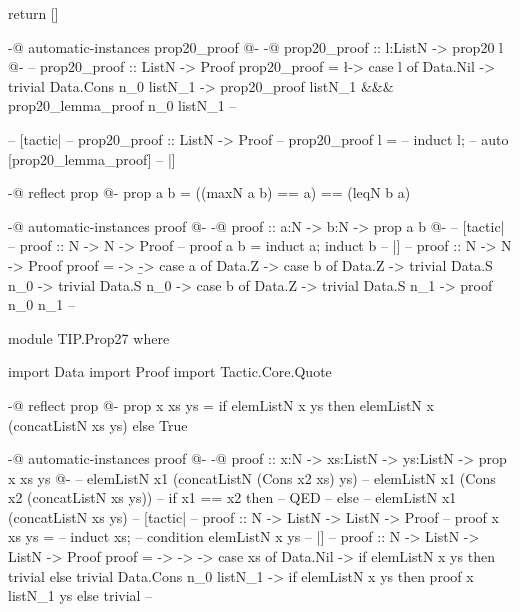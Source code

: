 return []

{-@ automatic-instances prop20_proof @-}
{-@
prop20_proof :: l:ListN -> {prop20 l}
@-}
-- %
prop20_proof :: ListN -> Proof
prop20_proof = \l -> case l of
                         Data.Nil -> trivial
                         Data.Cons n_0
                                   listN_1 -> prop20_proof listN_1 &&& prop20_lemma_proof n_0 listN_1
-- %

-- [tactic|
-- prop20_proof :: ListN -> Proof
-- prop20_proof l =
--   induct l;
--   auto [prop20_lemma_proof]
-- |]


{-@ reflect prop @-}
prop a b = ((maxN a b) == a) == (leqN b a)

{-@ automatic-instances proof @-}
{-@
proof :: a:N -> b:N -> {prop a b}
@-}
-- [tactic|
-- proof :: N -> N -> Proof
-- proof a b = induct a; induct b
-- |]
-- %
proof :: N -> N -> Proof
proof = \a -> \b -> case a of
                        Data.Z -> case b of
                                      Data.Z -> trivial
                                      Data.S n_0 -> trivial
                        Data.S n_0 -> case b of
                                          Data.Z -> trivial
                                          Data.S n_1 -> proof n_0 n_1
-- %


module TIP.Prop27 where

import Data
import Proof
import Tactic.Core.Quote

{-@ reflect prop @-}
prop x xs ys = 
  if elemListN x ys then 
    elemListN x (concatListN xs ys)
  else 
    True

{-@ automatic-instances proof @-}
{-@
proof :: x:N -> xs:ListN -> ys:ListN -> {prop x xs ys}
@-}
-- elemListN x1 (concatListN (Cons x2 xs) ys)
-- elemListN x1 (Cons x2 (concatListN xs ys))
-- if x1 == x2 then 
--   QED
-- else
--   elemListN x1 (concatListN xs ys)
-- [tactic|
-- proof :: N -> ListN -> ListN -> Proof
-- proof x xs ys =
--   induct xs;
--   condition {elemListN x ys}
-- |]
-- %
proof :: N -> ListN -> ListN -> Proof
proof = \x -> \xs -> \ys -> case xs of
                                Data.Nil -> if elemListN x ys then trivial else trivial
                                Data.Cons n_0 listN_1 -> if elemListN x ys
                                                          then proof x listN_1 ys
                                                          else trivial
-- %

